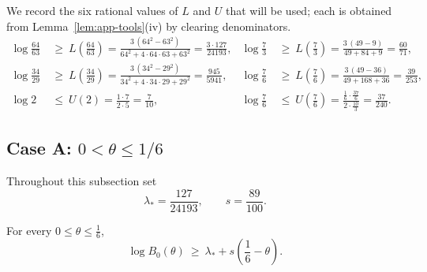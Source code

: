 We record the six rational values of $L$ and $U$ that will be used; each is
obtained from Lemma~\ref{lem:app-tools}(iv) by clearing denominators.
\begin{equation}\label{eq:app-pade-values}
\begin{aligned}
        \log\frac{64}{63}&\ \ge\ L\!\left(\frac{64}{63}\right)
        =\frac{3\,(64^2-63^2)}{64^2+4\cdot64\cdot63+63^2}
        =\frac{3\cdot127}{24193},
        &
        \log\frac73&\ \ge\ L\!\left(\frac73\right)
        =\frac{3\,(49-9)}{49+84+9}
        =\frac{60}{71},
        \\[1mm]
        \log\frac{34}{29}&\ \ge\ L\!\left(\frac{34}{29}\right)
        =\frac{3\,(34^2-29^2)}{34^2+4\cdot34\cdot29+29^2}
        =\frac{945}{5941},
        &
        \log\frac76&\ \ge\ L\!\left(\frac76\right)
        =\frac{3\,(49-36)}{49+168+36}
        =\frac{39}{253},
        \\[1mm]
        \log 2&\ \le\ U(2)
        =\frac{1\cdot7}{2\cdot5}
        =\frac{7}{10},
        &
        \log\frac76&\ \le\ U\!\left(\frac76\right)
        =\frac{\frac16\cdot\frac{37}6}{2\cdot\frac{10}3}
        =\frac{37}{240}.
\end{aligned}
\end{equation}

\subsection*{Case A: $0<\theta\le1/6$}

Throughout this subsection set
\[
        \lambda_*=\frac{127}{24193},
        \qquad
        s=\frac{89}{100}.
\]

\begin{lemma}\label{lem:app-B0-linear}
For every $0\le\theta\le\frac16$,
\[
        \log B_0(\theta)\ \ge\ \lambda_*+s\left(\frac16-\theta\right).
\]
\end{lemma}

